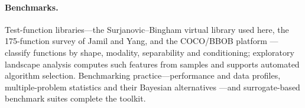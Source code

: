 \paragraph{Benchmarks.} Test-function libraries---the Surjanovic--Bingham virtual library used here, the 175-function
survey of Jamil and Yang, and the COCO/BBOB platform \cite{jamil2013literature,hansen2021coco}---classify functions by
shape, modality, separability and conditioning; exploratory landscape analysis computes such features from samples
\cite{mersmann2011exploratory,kerschke2019comprehensive} and supports automated algorithm selection. Benchmarking
practice---performance and data profiles, multiple-problem statistics and their Bayesian alternatives
\cite{dolan2002benchmarking,more2009benchmarking,demsar2006statistical,benavoli2017time,bartzbeielstein2020benchmarking}---and
surrogate-based benchmark suites \cite{pfisterer2022yahpo} complete the toolkit.
